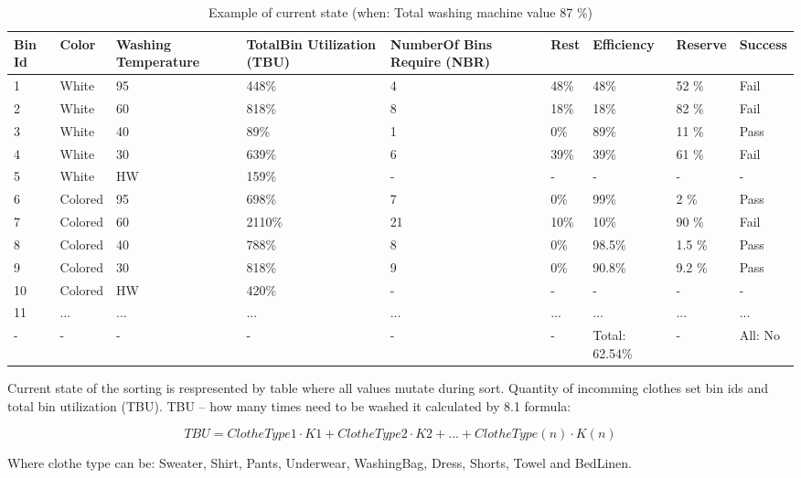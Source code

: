 \begin{table}[h]
	
    \begin{tabular}{ | p{0.4cm} | p{1cm} | p{2cm} | p{1.7cm} |p{2cm} |p{1cm} |p{1.3cm} |p{1.2cm} |p{1.3cm} |}
    \hline
	Bin Id & Color & Washing Temperature & TotalBin Utilization (TBU) & NumberOf Bins Require (NBR) & Rest & Efficiency & Reserve & Success\\ \hline
	1 & White & 95 & 448\% & 4 & 48\% & 48\% & 52 \% & Fail \\ \hline
	2 & White & 60 & 818\% & 8 & 18\% & 18\% & 82 \% & Fail \\ \hline
	3 & White & 40 & 89\% & 1 & 0\% & 89\% & 11 \% & Pass \\ \hline
	4 & White & 30 & 639\% & 6 & 39\% & 39\% & 61 \% & Fail \\ \hline
	5 & White & HW & 159\% & - & - & - & - & - \\ \hline
	6 & Colored & 95 & 698\% & 7 & 0\% & 99\% & 2 \% & Pass \\ \hline
	7 & Colored & 60 & 2110\% & 21 & 10\% & 10\% & 90 \% & Fail \\ \hline
	8 & Colored & 40 & 788\% & 8 & 0\% & 98.5\% & 1.5 \% & Pass \\ \hline
	9 & Colored & 30 & 818\% & 9 & 0\% & 90.8\% & 9.2 \% & Pass \\ \hline
	10 & Colored & HW & 420\% & - & - & - & - & - \\ \hline
	11 & ... & ... & ... & ... & ... & ... & ... & ... \\ \hline
	- & - & - & - & - & - & Total: 62.54\% & - & All: No \\ \hline
    \end{tabular}
	\caption{Example of current state (when: Total washing machine value 87 \%)}
	\label{tab:AdDis}
\end{table}

\newpage
Current state of the sorting is respresented by table where all values mutate during sort. Quantity of incomming clothes set bin ids and total bin utilization (TBU). TBU – how many times need to be washed it calculated by 8.1 formula:

\begin{equation}
TBU=ClotheType1\cdot K1+ClotheType2\cdot K2+...+ClotheType(n)\cdot K(n) \label{eq:eq1}
\end{equation}


Where clothe type can be: Sweater, Shirt, Pants, Underwear, WashingBag, Dress, Shorts, Towel and BedLinen. 


